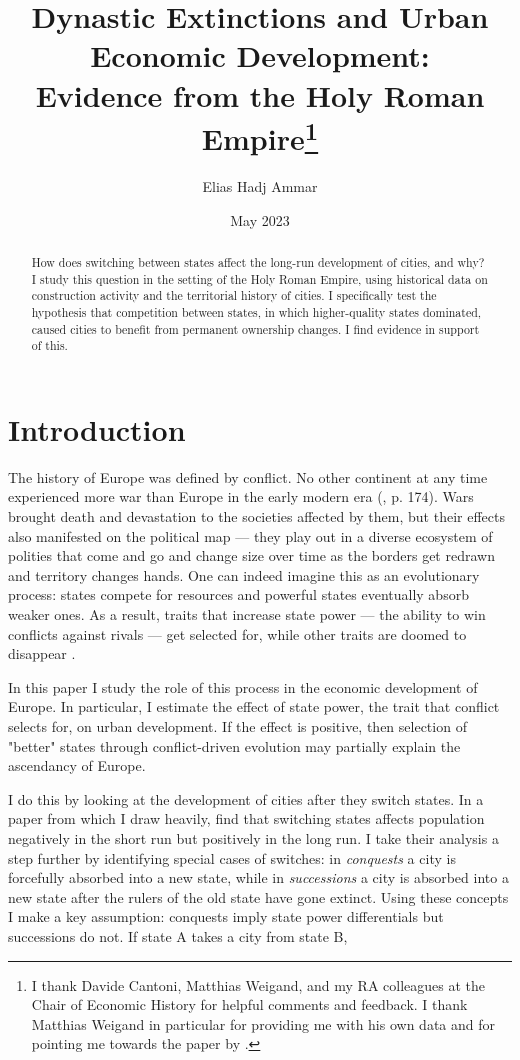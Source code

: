 \documentclass{article}
\title{Dynastic Extinctions and Urban Economic Development: \\Evidence from the Holy Roman Empire\footnote{
I thank Davide Cantoni, Matthias Weigand, and my RA colleagues at the Chair of Economic History for helpful comments and feedback. I thank Matthias Weigand in particular for providing me with his own data and for pointing me towards the paper by \cite{schoenholzer2022}.
}
}
\author{Elias Hadj Ammar}
\date{May 2023}
\begin{document}
\onehalfspacing
\maketitle
\thispagestyle{empty}

\begin{abstract}
How does switching between states affect the long-run development of cities, and why? I study this question in the setting of the Holy Roman Empire, using historical data on construction activity and the territorial history of cities. I specifically test the hypothesis that competition between states, in which higher-quality states dominated, caused cities to benefit from permanent ownership changes. I find evidence in support of this.
\end{abstract}

\newpage

\setcounter{page}{1}
\doublespacing



\section{Introduction}



The history of Europe was defined by conflict. No other continent at any time experienced more war than Europe in the early modern era (\citealp{voigtlnder2013}, p. 174). Wars brought death and devastation to the societies affected by them, but their effects also manifested on the political map --- they play out in a diverse ecosystem of polities that come and go and change size over time as the borders get redrawn and territory changes hands. One can indeed imagine this as an evolutionary process: states compete for resources and powerful states eventually absorb weaker ones. As a result, traits that increase state power --- the ability to win conflicts against rivals --- get selected for, while other traits are doomed to disappear \citep{levine2013, levine2021}.

In this paper I study the role of this process in the economic development of Europe. In particular, I estimate the effect of state power, the trait that conflict selects for, on urban development. If the effect is positive, then selection of "better" states through conflict-driven evolution may partially explain the ascendancy of Europe.

I do this by looking at the development of cities after they switch states. In a paper from which I draw heavily, \cite{schoenholzer2022} find that switching states affects population negatively in the short run but positively in the long run. I take their analysis a step further by identifying special cases of switches: in \textit{conquests} a city is forcefully absorbed into a new state, while in \textit{successions} a city is absorbed into a new state after the rulers of the old state have gone extinct. 
Using these concepts I make a key assumption: conquests imply state power differentials but successions do not. If state A takes a city from state B, 
\end{document}
